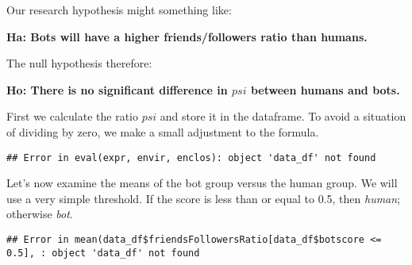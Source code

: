 \documentclass[]{article}
\newenvironment{Shaded}{\begin{snugshade}}{\end{snugshade}}
\newcommand{\CommentTok}[1]{\textcolor[rgb]{0.56,0.35,0.01}{\textit{#1}}}
\newcommand{\DataTypeTok}[1]{\textcolor[rgb]{0.13,0.29,0.53}{#1}}
\newcommand{\FloatTok}[1]{\textcolor[rgb]{0.00,0.00,0.81}{#1}}
\newcommand{\KeywordTok}[1]{\textcolor[rgb]{0.13,0.29,0.53}{\textbf{#1}}}
\newcommand{\NormalTok}[1]{#1}
\newcommand{\OperatorTok}[1]{\textcolor[rgb]{0.81,0.36,0.00}{\textbf{#1}}}
\newcommand{\StringTok}[1]{\textcolor[rgb]{0.31,0.60,0.02}{#1}}
\begin{document}
Our research hypothesis might something like:

\textbf{Ha: Bots will have a higher friends/followers ratio than
humans.}

The null hypothesis therefore:

\textbf{Ho: There is no significant difference in \(psi\) between humans
and bots.}

First we calculate the ratio \(psi\) and store it in the dataframe. To
avoid a situation of dividing by zero, we make a small adjustment to the
formula.

\begin{Shaded}
\end{Shaded}

\begin{verbatim}
## Error in eval(expr, envir, enclos): object 'data_df' not found
\end{verbatim}

Let's now examine the means of the bot group versus the human group. We
will use a very simple threshold. If the score is less than or equal to
0.5, then \emph{human}; otherwise \emph{bot}.

\begin{Shaded}
\end{Shaded}

\begin{verbatim}
## Error in mean(data_df$friendsFollowersRatio[data_df$botscore <= 0.5], : object 'data_df' not found
\end{verbatim}

\begin{Shaded}
\end{Shaded}
\end{document}
